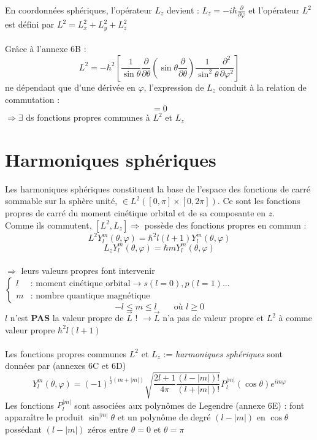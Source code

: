 \documentclass[british,french,11pt, a4paper, openany]{book}
\begin{document}
	En coordonnées sphériques, l'opérateur $L_z$ devient : $L_z=-i\hbar\frac{\partial}{\partial\varphi}$ et l'opérateur $L^2$ est défini par $L^2=L^2_x+L_y^2+L_z^2$\\\\
	Grâce à l'annexe 6B : \begin{equation}
		L^2=-\hbar^2\left[\frac{1}{\sin\theta}\frac{\partial}{\partial\theta}\left(\sin\theta\frac{\partial}{\partial\theta}\right)\frac{1}{\sin^2\theta}\frac{\partial^2}{\partial\varphi^2}\right]
	\end{equation}
	ne dépendant que d'une dérivée en $\varphi$, l'expression de $L_z$ conduit à la relation de commutation :\begin{equation}
		[L^2,L_z]=0
	\end{equation}
	$\Rightarrow\exists$ ds fonctions propres communes à $L^2$ et $L_z$
	\section{Harmoniques sphériques}
	Les harmoniques sphériques constituent la base de l'espace des fonctions de carré sommable sur la sphère unité, $\in L^2([0,\pi]\times[0,2\pi])$. Ce sont les fonctions propres de carré du moment cinétique orbital et de sa composante en $z$.\\
	Comme ils commutent, $[L^2,L_z]\Rightarrow$ possède des fonctions propres en commun : \begin{equation}
		L^2Y_l^m(\theta,\varphi)=\hbar^2l(l+1)Y_l^m(\theta,\varphi)
	\end{equation}\begin{equation}
	L_zY^m_l(\theta,\varphi)=\hbar mY_l^m(\theta,\varphi)
\end{equation}\ \\
$\Rightarrow$ leurs valeurs propres font intervenir $\left\{\begin{array}{cl}
l & \text{: moment cinétique orbital} \rightarrow s(l=0),p(l=1)...\\
m & \text{: nombre quantique magnétique}
\end{array}\right.$
\begin{equation}
	-l\leq m\leq l\qquad \text{où }l\geq 0
\end{equation}
\danger $l$ n'est \textbf{PAS} la valeur propre de $\vec L$ ! $\rightarrow \vec L$ n'a pas de valeur propre et $L^2$ à comme valeur propre $\hbar^2l(l+1)$ \\\\
Les fonctions propres communes $L^2$ et $L_z$ := \textit{harmoniques sphériques} sont données par (annexes 6C et 6D)\begin{equation}
	Y_l^m(\theta,\varphi)=(-1)^{\frac{1}{2}(m+|m|)}\sqrt{\frac{2l+1}{4\pi}\frac{(l-|m|)!}{(l+|m|)!}}P_l^{|m|}(\cos\theta)e^{im\varphi}
\end{equation}
Les fonctions $P_l^{|m|}$ sont associées aux polynômes de Legendre (annexe 6E) : font apparaître le produit $\sin^{|m|}\theta$ et un polynôme de degré $(l-|m|)$ en $\cos\theta$ possédant $(l-|m|)$ zéros entre $\theta=0$ et $\theta=\pi$
\end{document}

